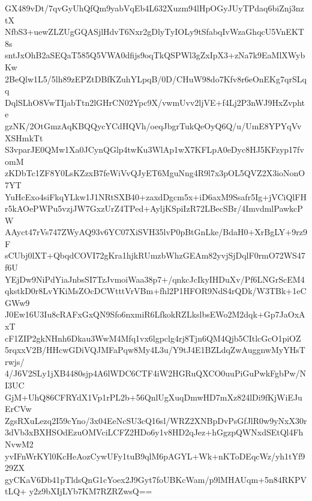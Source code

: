 GX489vDt/7qvGyUhQfQm9yabVqEb4L632Xuzm94lHpOGyJUyTPdaq6biZnj3nztX
NfbS3+uewZLZUgGQASjlHdvT6Nxr2gDlyTyIOLy9tSfabqIvWzaGhqcU5VnEKT8s
sntJxOhB2aSEQaT585Q5VWA0dfijs9oqTkQSPWl3gZxIpX3+zNa7k9EaMlXWybKw
2BeQlw1L5/5lh89zEPZtDBfKZuhYLpqB/0D/CHuW98do7Kfv8r6eOnEKg7qrSLqq
DqlSLhO8VwTIjabTtn2lGHrCN02Ypc9X/vwmUvv2ljVE+f4Lj2P3nWJ9HxZvphte
gzNK/2OtGmzAqKBQQycYCdHQVh/oeqJbgrTukQeOyQ6Q/u/UmE8YPYqVvXSHmkTt
S3vparJE0QMw1Xa0JCynQGlp4twKu3WlAp1wX7KFLpA0eDyc8HJ5KFzyp17fvomM
zKDbTc1ZF8Y0LsKZzxB7feWiVvQJyET6MguNng4R9l7x3pOL5QVZ2X3ioNonO7YT
YuHcExo4siFkqYLkw1J1NRtSXB40+zaxdDgcm5x+iD6axM9Ssafr5Ig+jVCiQlFH
r5kAOePWPu5vzjJW7GxzUrZ4TPed+AyljKSpiIzR72LBecSBr/4ImvdmlPawkcPW
AAyct47rVs747ZWyAQ93v6YC07XiSVH35lvP0pBtGnLke/BdaH0+XrBgLY+9rz9F
sCUbj0lXT+QbqdCOVI72gKra1hjkRUmzbWhzGEAm82yvjSjDqlF0rmO72WS47f6U
YEjDw9NiPdYiaJnbsSI7TzJvmoiWaa38p7+/qnkcJcIkyIHDuXv/Pf6LNGrScEM4
qkstkD0r8LvYKiMsZOcDCWtttVrVBm+fhl2P1HFOR9NdS4rQDk/W3TBk+1eCGWw9
J0Ew16U3Iu8cRAFxGxQN9Sfo6nxmiR6LfkokRZLkslbsEWo2M2dqk+Gp7JaOxAxT
cF1ZIP2gkNHnh6Dkau3WwM4Mfq1vx6lgpclg4rj8Tjn6QM4Qjb5CItlcGcO1piOZ
5rqxxV2B/HHcwGDiVQJMFaPqw8My4L3u/Y9tJ4E1BZLdqZwAuggnwMyYHsTrwjs/
4/J6V2SLy1jXB4480sjp4A6lWDC6CTF4iW2HGRuQXCO0uuPiGuPwkFgbPw/NI3UC
GjM+UhQ86CFRYdX1Vp1rPL2b+56QnlUgXuqDmwHD7mXz824lDi9fKjWiEJuErCVw
ZgsRXuLezq2I59cYno/3x04EeNcSU3cQ16sl/WRZ2XNBpDvPsGfJlR0w9yNxX30r
3dVb3xBXHSOdEzuOMVciLCFZ2HDo6y1v8HD2qJez+hGgzpQWNxdSEtQl4FhNvwM2
yvIFnWrKYl0KcHeAozCywUFy1tuB9qlM6pAGYL+Wk+nKToDEqcWz/yh1tYf929ZX
gyCKaV6Db41pTldsQnG1cYoex2J9Gyt7foUBKcWam/p9lMHAUqm+5n84RKPVtLQ+
y2z9bXIjLYb7KM7RZRZwsQ==

